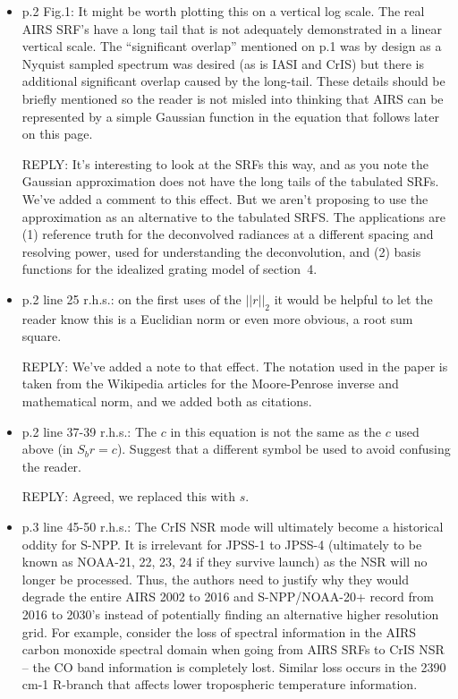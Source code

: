 \documentclass[11pt]{article}
\newcommand {\reply} {\mbox{\small REPLY}}
\begin{document}
\begin{itemize}
\item p.2 Fig.1: It might be worth plotting this on a vertical log
  scale. The real AIRS SRF’s have a long tail that is not adequately
  demonstrated in a linear vertical scale. The “significant overlap”
  mentioned on p.1 was by design as a Nyquist sampled spectrum was
  desired (as is IASI and CrIS) but there is additional significant
  overlap caused by the long-tail. These details should be briefly
  mentioned so the reader is not misled into thinking that AIRS can
  be represented by a simple Gaussian function in the equation that
  follows later on this page.

  \reply: It's interesting to look at the SRFs this way, and as you
  note the Gaussian approximation does not have the long tails of
  the tabulated SRFs.  We've added a comment to this effect.  But we
  aren't proposing to use the approximation as an alternative to the
  tabulated SRFS.  The applications are (1) reference truth for the
  deconvolved radiances at a different spacing and resolving power,
  used for understanding the deconvolution, and (2) basis functions
  for the idealized grating model of section~4.

\item p.2 line 25 r.h.s.: on the first uses of the $||r||_2$ it
  would be helpful to let the reader know this is a Euclidian norm
  or even more obvious, a root sum square.

  \reply: We've added a note to that effect.  The notation used in
  the paper is taken from the Wikipedia articles for the
  Moore-Penrose inverse and mathematical norm, and we added both as
  citations.

\item p.2 line 37-39 r.h.s.: The $c$ in this equation is not the
  same as the $c$ used above (in $S_b r = c$). Suggest that a
  different symbol be used to avoid confusing the reader.

  \reply: Agreed, we replaced this with $s$.

\item p.3 line 45-50 r.h.s.: The CrIS NSR mode will ultimately
  become a historical oddity for S-NPP. It is irrelevant for JPSS-1
  to JPSS-4 (ultimately to be known as NOAA-21, 22, 23, 24 if they
  survive launch) as the NSR will no longer be processed. Thus, the
  authors need to justify why they would degrade the entire AIRS
  2002 to 2016 and S-NPP/NOAA-20+ record from 2016 to 2030’s instead
  of potentially finding an alternative higher resolution grid. For
  example, consider the loss of spectral information in the AIRS
  carbon monoxide spectral domain when going from AIRS SRFs to CrIS
  NSR – the CO band information is completely lost. Similar loss
  occurs in the 2390 cm-1 R-branch that affects lower tropospheric
  temperature information.


\end{itemize}
\end{document}
